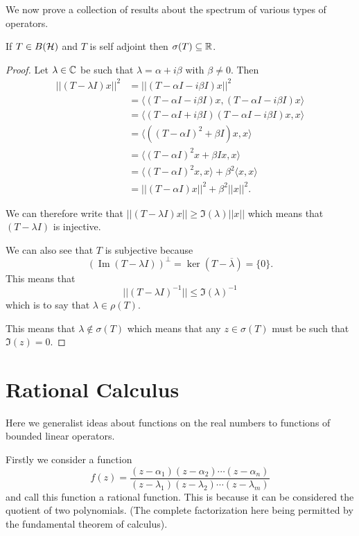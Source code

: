 \documentclass{unswmaths}
\begin{document}
We now prove a collection of results about the spectrum of various types of operators.

\begin{theorem}
	If $ T \in B(\mathcal{H}) $ and $ T $ is self adjoint then $ \sigma(T) \subseteq \mathbb{R} $.
\end{theorem}
\begin{proof}
	Let $ \lambda \in \mathbb{C} $ be such that $ \lambda = \alpha + i \beta $ with $ \beta \neq 0 $.
	Then 
	\begin{align*}
		||(T - \lambda I)x||^2 &= ||( T - \alpha I - i \beta I)x||^2 \\
			&= \langle (T - \alpha I - i \beta I)x, (T - \alpha I - i \beta I)x \rangle \\
			&= \langle (T - \alpha I + i \beta I) (T - \alpha I - i \beta I)x,x \rangle \\
			&= \langle \left((T - \alpha I)^2 + \beta I \right)x,x \rangle \\
			&= \langle (T - \alpha I)^2x + \beta Ix ,x \rangle \\
			&= \langle (T - \alpha I)^2 x, x \rangle + \beta^2 \langle x, x\rangle \\
			&= ||(T-\alpha I)x||^2 + \beta^2 ||x||^2.
	\end{align*}
	
	We can therefore write that $ || (T- \lambda I)x || \geq \Im(\lambda)||x|| $ which means that
	$ (T - \lambda I ) $ is injective.
	
	We can also see that $ T $ is subjective because
	$$
		\left(\operatorname{Im}(T - \lambda I)\right)^\perp = \ker(T - \overline{\lambda}) = \{ 0 \}.
	$$
	This means that $$ || (T - \lambda I)^{-1} || \leq \Im(\lambda)^{-1} $$ which is to say that 
	$ \lambda \in \rho(T) $.
	
	This means that $ \lambda \not\in \sigma(T) $ which means that any $ z \in \sigma(T) $ must be such that
	$ \Im(z) = 0 $.
\end{proof}

\section*{Rational Calculus}
Here we generalist ideas about functions on the real numbers to functions of bounded linear operators.

Firstly we consider a function 
$$
	f(z) = \frac{(z-\alpha_1) (z - \alpha_2) \cdots (z - \alpha_n)}{(z - \lambda_1) (z- \lambda_2) \cdots (z - \lambda_m)}
$$
and call this function a rational function. This is because it can be considered the quotient of two polynomials. (The complete factorization here being
permitted by the fundamental theorem of calculus).
\end{document}
